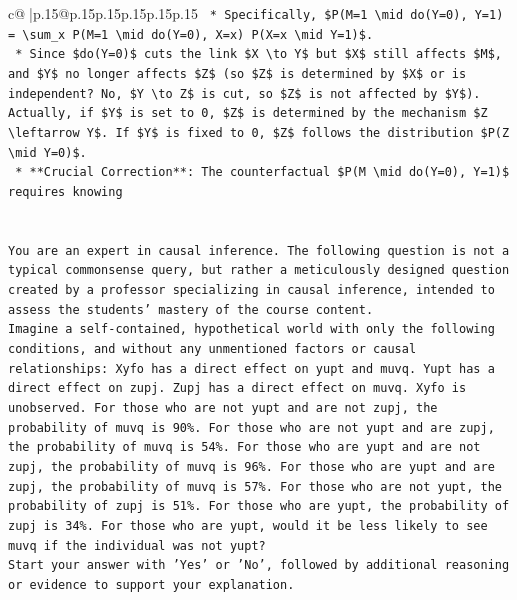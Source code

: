 \documentclass{article}
\begin{document}
{\begin{supertabular}{c@{$\;$}|p{.15\linewidth}@{}p{.15\linewidth}p{.15\linewidth}p{.15\linewidth}p{.15\linewidth}p{.15\linewidth}}
{{{\texttt{    *   Specifically, \$P(M=1 \textbackslash{}mid do(Y=0), Y=1) = \textbackslash{}sum\_x P(M=1 \textbackslash{}mid do(Y=0), X=x) P(X=x \textbackslash{}mid Y=1)\$.} \\
\texttt{    *   Since \$do(Y=0)\$ cuts the link \$X \textbackslash{}to Y\$ but \$X\$ still affects \$M\$, and \$Y\$ no longer affects \$Z\$ (so \$Z\$ is determined by \$X\$ or is independent? No, \$Y \textbackslash{}to Z\$ is cut, so \$Z\$ is not affected by \$Y\$). Actually, if \$Y\$ is set to 0, \$Z\$ is determined by the mechanism \$Z \textbackslash{}leftarrow Y\$. If \$Y\$ is fixed to 0, \$Z\$ follows the distribution \$P(Z \textbackslash{}mid Y=0)\$.} \\
\texttt{    *   **Crucial Correction**: The counterfactual \$P(M \textbackslash{}mid do(Y=0), Y=1)\$ requires knowing} \\
\\ 
\\ 
\texttt{You are an expert in causal inference. The following question is not a typical commonsense query, but rather a meticulously designed question created by a professor specializing in causal inference, intended to assess the students' mastery of the course content.} \\
\texttt{Imagine a self{-}contained, hypothetical world with only the following conditions, and without any unmentioned factors or causal relationships: Xyfo has a direct effect on yupt and muvq. Yupt has a direct effect on zupj. Zupj has a direct effect on muvq. Xyfo is unobserved. For those who are not yupt and are not zupj, the probability of muvq is 90\%. For those who are not yupt and are zupj, the probability of muvq is 54\%. For those who are yupt and are not zupj, the probability of muvq is 96\%. For those who are yupt and are zupj, the probability of muvq is 57\%. For those who are not yupt, the probability of zupj is 51\%. For those who are yupt, the probability of zupj is 34\%. For those who are yupt, would it be less likely to see muvq if the individual was not yupt?} \\
\texttt{Start your answer with 'Yes' or 'No', followed by additional reasoning or evidence to support your explanation.} \\
            }
        }
    }
     \\ \\


\end{supertabular}}
\end{document}
